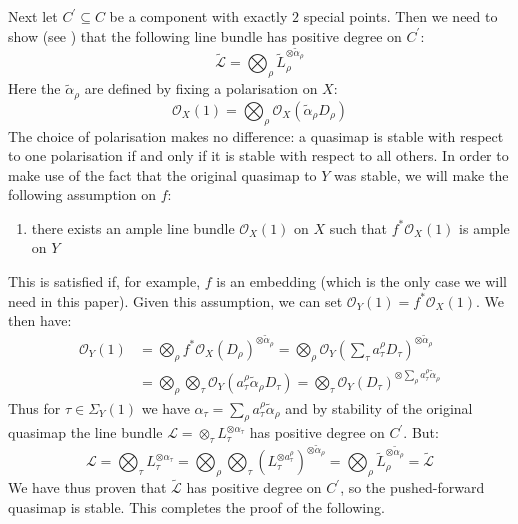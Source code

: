 \documentclass[11pt]{amsart}
\newcommand{\OO}{\mathcal{O}}
\theoremstyle{plain}
\theoremstyle{definition}
\begin{document}
Next let $C^\prime \subseteq C$ be a component with exactly $2$ special points. Then we need to show (see \cite[Definition 3.1.1]{CF-K}) that the following line bundle has positive degree on $C^\prime$:
\begin{equation*} \tilde{\mathcal{L}} = \bigotimes_\rho \tilde{L}_\rho^{\otimes \tilde{\alpha}_\rho} \end{equation*}
Here the $\tilde{\alpha}_\rho$ are defined by fixing a polarisation on $X$:
\begin{equation*} \OO_X(1) = \bigotimes_\rho \OO_X(\tilde{\alpha}_\rho D_\rho) \end{equation*}
The choice of polarisation makes no difference: a quasimap is stable with respect to one polarisation if and only if it is stable with respect to all others. In order to make use of the fact that the original quasimap to $Y$ was stable, we will make the following assumption on $f$:
\begin{enumerate}
\item there exists an ample line bundle $\OO_X(1)$ on $X$ such that $f^*\OO_X(1)$ is ample on $Y$
\end{enumerate}
This is satisfied if, for example, $f$ is an embedding (which is the only case we will need in this paper). Given this assumption, we can set $\OO_Y(1) = f^*\OO_X(1)$. We then have:
\begin{align*} \OO_Y(1) & = \bigotimes_\rho f^*\OO_X(D_\rho)^{\otimes \tilde{\alpha}_\rho} = \bigotimes_\rho \OO_Y (\sum_\tau a_\tau^\rho D_\tau)^{\otimes \tilde{\alpha}_\rho} \\
& = \bigotimes_\rho \bigotimes_\tau \OO_Y(a_\tau^\rho \tilde{\alpha}_\rho D_\tau) = \bigotimes_\tau \OO_Y(D_\tau)^{\otimes \sum_\rho a_\tau^\rho \tilde{\alpha}_\rho}\end{align*}
Thus for $\tau \in \Sigma_Y(1)$ we have $\alpha_\tau = \sum_\rho a_\tau^\rho \tilde{\alpha}_\rho$ and by stability of the original quasimap the line bundle $\mathcal{L} = \otimes_\tau L_\tau^{\otimes \alpha_\tau}$ has positive degree on $C^\prime$. But:
\begin{equation*} \mathcal{L} = \bigotimes_\tau L_\tau^{\otimes \alpha_\tau} = \bigotimes_\rho \bigotimes_\tau \left( L_\tau^{\otimes a_\tau^\rho} \right)^{\otimes \tilde{\alpha}_\rho} = \bigotimes_\rho \tilde{L}_\rho^{\otimes \tilde{\alpha}_\rho} = \tilde{\mathcal{L}} \end{equation*}
We have thus proven that $\tilde{\mathcal{L}}$ has positive degree on $C^\prime$, so the pushed-forward quasimap is stable. This completes the proof of the following.
\end{document}
